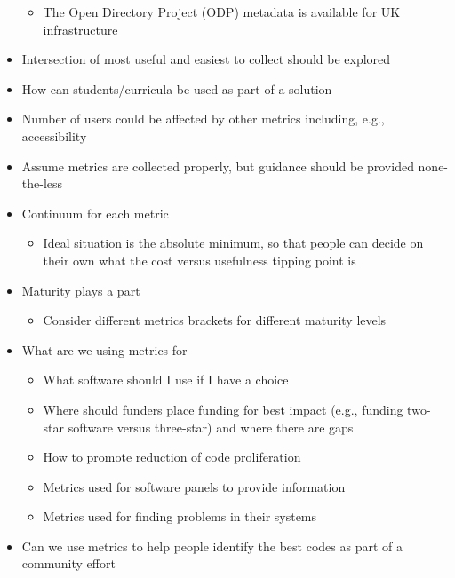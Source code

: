 \begin{itemize}
\begin{itemize}
\item
        The Open Directory Project (ODP) metadata is available for UK infrastructure
\end{itemize}

\item
Intersection of most useful and easiest to collect should be explored

\item
How can students/curricula be used as part of a solution

\item
Number of users could be affected by other metrics including, e.g., accessibility

\item
Assume metrics are collected properly, but guidance should be provided none-the-less

\item
Continuum for each metric

\begin{itemize}
\item
Ideal situation is the absolute minimum, so that people can decide on their own
what the cost versus usefulness tipping point is
        
\end{itemize}

\item
Maturity plays a part

\begin{itemize}
\item
        Consider different metrics brackets for different maturity levels
\end{itemize}

\item
What are we using metrics for

\begin{itemize}
\item
        What software should I use if I have a choice

\item
Where should funders place funding for best impact (e.g., funding two-star
software versus three-star) and where there are gaps

\item
        How to promote reduction of code proliferation

\item
        Metrics used for software panels to provide information

\item
        Metrics used for finding problems in their systems

\end{itemize}

\item
Can we use metrics to help people identify the best codes as part of a community
effort

\end{itemize}

